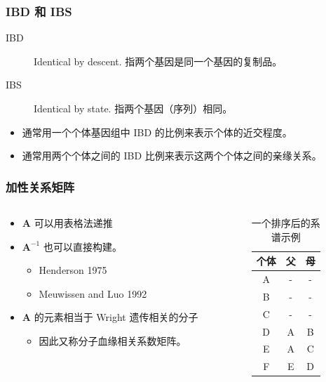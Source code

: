 \documentclass[serif,aspectratio=169]{beamer}
\begin{document}
\begin{frame}
  \frametitle{IBD 和 IBS}
  \begin{description}
  \item [IBD] Identical by descent. 指两个基因是同一个基因的复制品。
  \item [IBS] Identical by state. 指两个基因（序列）相同。
  \end{description}
  \begin{itemize}
  \item 通常用一个个体基因组中 IBD 的比例来表示个体的近交程度。
  \item 通常用两个个体之间的 IBD 比例来表示这两个个体之间的亲缘关系。
  \end{itemize}
\end{frame}


\begin{frame}
  \frametitle{加性关系矩阵}
  \begin{columns}
    \begin{column}{.5\textwidth}
      \begin{itemize}
      \item $\mathbf{A}$ 可以用表格法递推
      \item $\mathbf{A}^{-1}$ 也可以直接构建。
        \begin{itemize}
        \item Henderson 1975
        \item Meuwissen and Luo 1992
        \end{itemize}
      \item $\mathbf{A}$ 的元素相当于 Wright 遗传相关的分子
        \begin{itemize}
        \item 因此又称分子血缘相关系数矩阵。
        \end{itemize}
      \end{itemize}
    \end{column}

    \pause
    \begin{column}{.5\textwidth}
      \begin{table}
        \caption{一个排序后的系谱示例}
        \begin{tabular}{ccc}
          个体 & 父 & 母\\\hline
          A & - & -\\
          B & - & -\\
          C & - & -\\
          D & A & B\\
          E & A & C\\
          F & E & D
        \end{tabular}
      \end{table}
    \end{column}
  \end{columns}
\end{frame}
\end{document}
